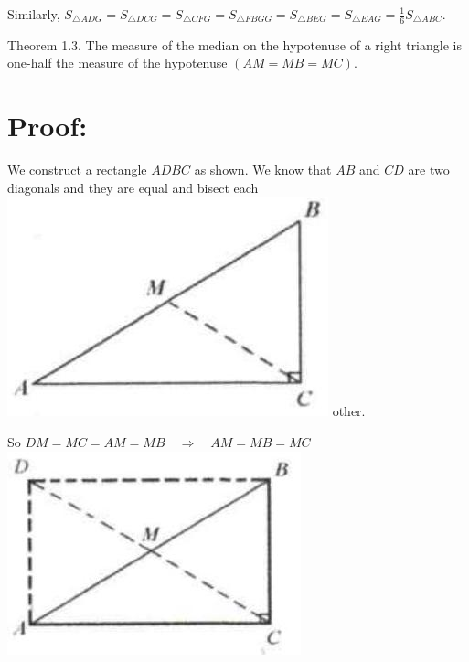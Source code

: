 \documentclass[10pt]{article}
\begin{document}
Similarly, \(S_{\triangle A D G}=S_{\triangle D C G}=S_{\triangle C F G}=S_{\triangle F B G G}=S_{\triangle B E G}=S_{\triangle E A G}=\frac{1}{6} S_{\triangle A B C}\).

Theorem 1.3. The measure of the median on the hypotenuse of a right triangle is one-half the measure of the hypotenuse \((A M=M B=M C)\).

\section*{Proof:}
We construct a rectangle \(A D B C\) as shown. We know that \(A B\) and \(C D\) are two diagonals and they are equal and bisect each\\
\includegraphics[max width=\textwidth]{2025_04_17_97bc1f7e44d93c271a88g-008(2)} other.

So \(D M=M C=A M=M B \quad \Rightarrow \quad A M=M B=M C\)\\
\includegraphics[max width=\textwidth, center]{2025_04_17_97bc1f7e44d93c271a88g-008}
\end{document}
